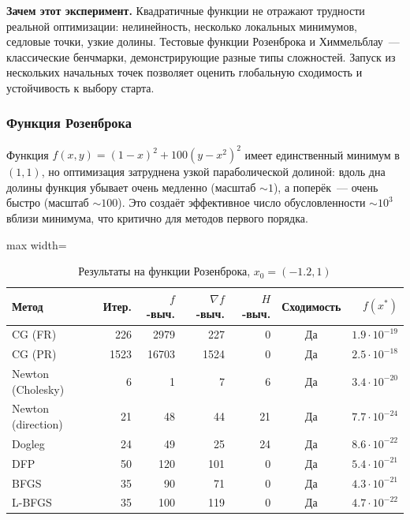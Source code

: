 \documentclass[12pt]{article}
\begin{document}
\textbf{Зачем этот эксперимент.} Квадратичные функции не отражают трудности реальной оптимизации: нелинейность, несколько локальных минимумов, седловые точки, узкие долины. Тестовые функции Розенброка и Химмельблау~--- классические бенчмарки, демонстрирующие разные типы сложностей. Запуск из нескольких начальных точек позволяет оценить глобальную сходимость и устойчивость к выбору старта.

\subsubsection{Функция Розенброка}

Функция $f(x,y) = (1-x)^2 + 100(y-x^2)^2$ имеет единственный минимум в $(1, 1)$, но оптимизация затруднена узкой параболической долиной: вдоль дна долины функция убывает очень медленно (масштаб $\sim 1$), а поперёк~--- очень быстро (масштаб $\sim 100$). Это создаёт эффективное число обусловленности $\sim 10^3$ вблизи минимума, что критично для методов первого порядка.

\begin{table}[H]
\centering
\caption{Результаты на функции Розенброка, $x_0 = (-1.2, 1)$}
\begin{adjustbox}{max width=\textwidth}
\begin{tabular}{lrrrrcr}
\toprule
\textbf{Метод} & \textbf{Итер.} & \textbf{$f$-выч.} & \textbf{$\nabla f$-выч.} & \textbf{$H$-выч.} & \textbf{Сходимость} & $f(x^*)$ \\
\midrule
CG (FR)            & 226  & 2979  & 227   & 0  & Да  & $1.9 \cdot 10^{-19}$ \\
CG (PR)            & 1523 & 16703 & 1524  & 0  & Да  & $2.5 \cdot 10^{-18}$ \\
Newton (Cholesky)  & 6    & 1     & 7     & 6  & Да  & $3.4 \cdot 10^{-20}$ \\
Newton (direction) & 21   & 48    & 44    & 21 & Да  & $7.7 \cdot 10^{-24}$ \\
Dogleg             & 24   & 49    & 25    & 24 & Да  & $8.6 \cdot 10^{-22}$ \\
DFP                & 50   & 120   & 101   & 0  & Да  & $5.4 \cdot 10^{-21}$ \\
BFGS               & 35   & 90    & 71    & 0  & Да  & $4.3 \cdot 10^{-21}$ \\
L-BFGS             & 35   & 100   & 119   & 0  & Да  & $4.7 \cdot 10^{-22}$ \\
\bottomrule
\end{tabular}
\end{adjustbox}
\end{table}
\end{document}
